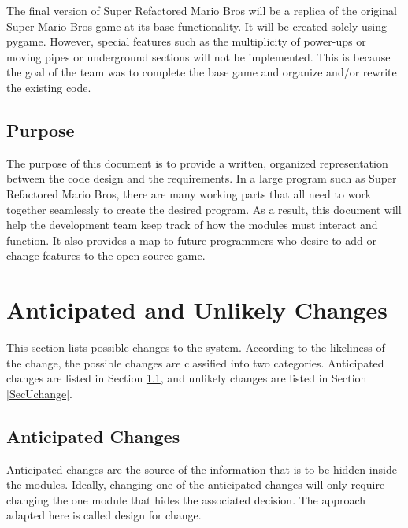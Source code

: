 \documentclass[12pt, titlepage]{article}
\begin{document}
The final version of Super Refactored Mario Bros will be a replica of the original Super Mario Bros game at its base functionality. It will be created solely using pygame. However, special features such as the multiplicity of power-ups or moving pipes or underground sections will not be implemented. This is because the goal of the team was to complete the base game and organize and/or rewrite the existing code.

\subsection{Purpose}

The purpose of this document is to provide a written, organized representation between the code design and the requirements. In a large program such as Super Refactored Mario Bros, there are many working parts that all need to work together seamlessly to create the desired program. As a result, this document will help the development team keep track of how the modules must interact and function. It also provides a map to future programmers who desire to add or change features to the open source game.

\section{Anticipated and Unlikely Changes} \label{SecChange}

This section lists possible changes to the system. According to the likeliness
of the change, the possible changes are classified into two
categories. Anticipated changes are listed in Section \ref{SecAchange}, and
unlikely changes are listed in Section \ref{SecUchange}.

\subsection{Anticipated Changes} \label{SecAchange}

Anticipated changes are the source of the information that is to be hidden
inside the modules. Ideally, changing one of the anticipated changes will only
require changing the one module that hides the associated decision. The approach
adapted here is called design for
change.
\end{document}
